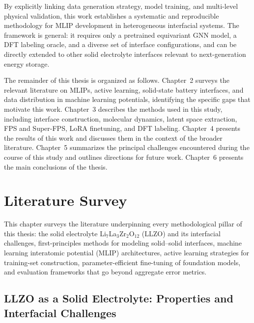 \documentclass[12pt,a4paper,oneside]{book}
\begin{document}
By explicitly linking data generation strategy, model training, and multi-level
physical validation, this work establishes a systematic and reproducible methodology
for MLIP development in heterogeneous interfacial systems. The framework is
general: it requires only a pretrained equivariant GNN model, a DFT labeling oracle,
and a diverse set of interface configurations, and can be directly extended to other
solid electrolyte interfaces relevant to next-generation energy storage.

The remainder of this thesis is organized as follows. Chapter~2 surveys the relevant literature on MLIPs, active learning, solid-state battery interfaces, and data distribution in machine learning potentials, identifying the specific gaps that motivate this work. Chapter~3 describes the methods used in this study, including interface construction, molecular dynamics, latent space extraction, FPS and Super-FPS, LoRA finetuning, and DFT labeling. Chapter~4 presents the results of this work and discusses them in the context of the broader literature. Chapter~5 summarizes the principal challenges encountered during the course of this study and outlines directions for future work. Chapter~6 presents the main conclusions of the thesis.

\chapter{Literature Survey}
\label{ch:litsurvey}

This chapter surveys the literature underpinning every methodological pillar of this thesis: the solid electrolyte Li$_7$La$_3$Zr$_2$O$_{12}$ (LLZO) and its interfacial challenges, first-principles methods for modeling solid--solid interfaces, machine learning interatomic potential (MLIP) architectures, active learning strategies for training-set construction, parameter-efficient fine-tuning of foundation models, and evaluation frameworks that go beyond aggregate error metrics.

\section{LLZO as a Solid Electrolyte: Properties and Interfacial Challenges}
\label{sec:llzo}
\end{document}
